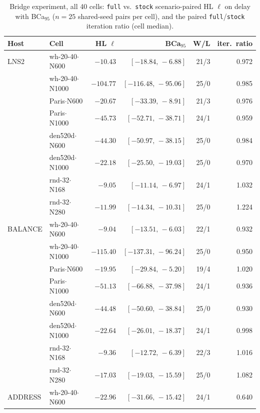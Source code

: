 \begin{table}[t]\centering\footnotesize
\caption{Bridge experiment, all 40 cells: \texttt{full} vs.\ \texttt{stock}
scenario-paired HL $\ell$ on delay with BCa$_{95}$ ($n{=}25$ shared-seed pairs per
cell), and the paired \texttt{full}/\texttt{stock} iteration ratio (cell median).}
\label{stab:bridge-percell}
\begin{tabular}{@{}llrrrr@{}}
\toprule
Host & Cell & HL $\ell$ & BCa$_{95}$ & W/L & iter.\ ratio \\
\midrule
LNS2 & wh-20-40$\cdot$N600 & $-10.43$ & $[-18.84,\,-6.88]$ & 21/3 & 0.972 \\
 & wh-20-40$\cdot$N1000 & $-104.77$ & $[-116.48,\,-95.06]$ & 25/0 & 0.985 \\
 & Paris$\cdot$N600 & $-20.67$ & $[-33.39,\,-8.91]$ & 21/3 & 0.976 \\
 & Paris$\cdot$N1000 & $-45.73$ & $[-52.71,\,-38.71]$ & 24/1 & 0.959 \\
 & den520d$\cdot$N600 & $-44.30$ & $[-50.97,\,-38.15]$ & 25/0 & 0.984 \\
 & den520d$\cdot$N1000 & $-22.18$ & $[-25.50,\,-19.03]$ & 25/0 & 0.970 \\
 & rnd-32$\cdot$N168 & $-9.05$ & $[-11.14,\,-6.97]$ & 24/1 & 1.032 \\
 & rnd-32$\cdot$N280 & $-11.99$ & $[-14.34,\,-10.31]$ & 25/0 & 1.224 \\
\midrule
BALANCE & wh-20-40$\cdot$N600 & $-9.04$ & $[-13.51,\,-6.03]$ & 22/1 & 0.932 \\
 & wh-20-40$\cdot$N1000 & $-115.40$ & $[-137.31,\,-96.24]$ & 25/0 & 0.950 \\
 & Paris$\cdot$N600 & $-19.95$ & $[-29.84,\,-5.20]$ & 19/4 & 1.020 \\
 & Paris$\cdot$N1000 & $-51.13$ & $[-66.88,\,-37.98]$ & 24/1 & 0.936 \\
 & den520d$\cdot$N600 & $-44.48$ & $[-50.60,\,-38.84]$ & 25/0 & 0.930 \\
 & den520d$\cdot$N1000 & $-22.64$ & $[-26.01,\,-18.37]$ & 24/1 & 0.998 \\
 & rnd-32$\cdot$N168 & $-9.36$ & $[-12.72,\,-6.39]$ & 22/3 & 1.016 \\
 & rnd-32$\cdot$N280 & $-17.03$ & $[-19.03,\,-15.59]$ & 25/0 & 1.082 \\
\midrule
ADDRESS & wh-20-40$\cdot$N600 & $-22.96$ & $[-31.66,\,-15.42]$ & 24/1 & 0.640 \\

\end{tabular}
\end{table}
